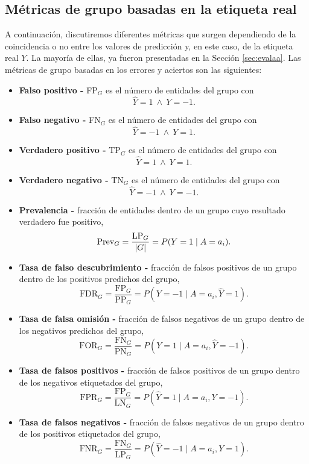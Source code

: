 \documentclass[oneside,openright,titlepage,numbers=noenddot,openany,headinclude,footinclude=true,
cleardoublepage=empty,abstractoff,BCOR=5mm,paper=a4,fontsize=12pt,main=spanish]{scrreprt}
\begin{document}
\subsection*{Métricas de grupo basadas en la etiqueta real}

\label{subsec:groupmetrics}

A continuación, discutiremos diferentes métricas que surgen dependiendo de la coincidencia o no entre los valores de predicción y, en este caso, de la etiqueta real $Y$. La mayoría de ellas, ya fueron presentadas en la Sección \ref{sec:evalaa}. Las métricas de grupo basadas en los errores y aciertos son las siguientes:

\begin{itemize} 
    \item \textbf{Falso positivo -} FP$_G$ es el número de entidades del grupo con $$\hat{Y} = 1 \ \wedge \ Y = -1.$$
    \item \textbf{Falso negativo -} FN$_G$ es el número de entidades del grupo con $$\hat{Y} = -1 \ \wedge \ Y = 1.$$
    \item \textbf{Verdadero positivo -} TP$_G$ es el número de entidades del grupo con $$\hat{Y} = 1 \ \wedge \ Y = 1.$$
    \item \textbf{Verdadero negativo -} TN$_G$ es el número de entidades del grupo con $$\hat{Y} = -1 \ \wedge \ Y = -1.$$
    \item \textbf{Prevalencia -}  fracción de entidades dentro de un grupo cuyo resultado verdadero fue positivo, $$\text{Prev}_G= \frac{\text{LP}_G}{\left\lvert G\right\rvert}=P(Y=1 \mid A=a_i).$$
    \item \textbf{Tasa de falso descubrimiento -} fracción de falsos positivos de un grupo dentro de los positivos predichos del grupo, $$\text{FDR}_G = \frac{\text{FP}_G}{\text{PP}_G} = P(Y=-1 \mid A=a_i,\hat{Y}=1).$$
    \item \textbf{Tasa de falsa omisión -} fracción de falsos negativos de un grupo dentro de los negativos predichos del grupo, $$\text{FOR}_G = \frac{\text{FN}_G}{\text{PN}_G} = P(Y=1 \mid A=a_i, \hat{Y}=-1).$$
    \item \textbf{Tasa de falsos positivos -} fracción de falsos positivos de un grupo dentro de los negativos etiquetados del grupo, $$\text{FPR}_G = \frac{\text{FP}_G}{\text{LN}_G} = P(\hat{Y}=1 \mid A=a_i,Y=-1).$$
    \item \textbf{Tasa de falsos negativos -} fracción de falsos negativos de un grupo dentro de los positivos etiquetados del grupo, $$\text{FNR}_G = \frac{\text{FN}_G}{\text{LP}_G} = P(\hat{Y}=-1 \mid A=a_i,Y=1).$$

\end{itemize}
\end{document}
